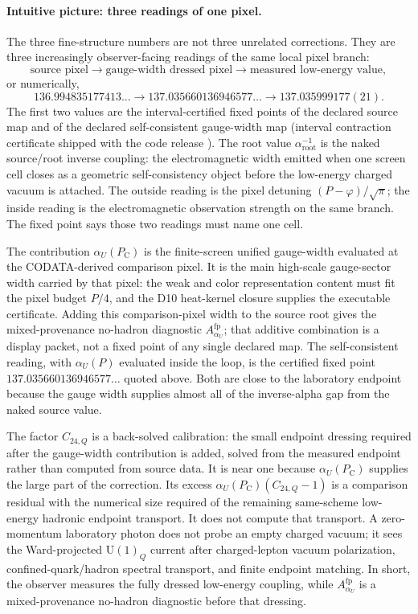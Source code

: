 \documentclass[11pt]{article}
\theoremstyle{remark}
\newcommand{\Ppub}{P_{\mathrm C}}
\begin{document}
\paragraph*{Intuitive picture: three readings of one pixel.}
The three fine-structure numbers are not three unrelated corrections. They are
three increasingly observer-facing readings of the same local pixel branch:
\[
\text{source pixel}
\longrightarrow
\text{gauge-width dressed pixel}
\longrightarrow
\text{measured low-energy value},
\]
or numerically,
\[
136.994835177413\ldots
\longrightarrow
137.035660136946577\ldots
\longrightarrow
137.035999177(21).
\]
The first two values are the interval-certified fixed points of the declared
source map and of the declared self-consistent gauge-width map
(interval contraction certificate shipped with the code release \cite{oph-code}).
The root value \(\alpha_{\mathrm{root}}^{-1}\) is the naked source/root inverse
coupling: the electromagnetic width emitted when one screen cell closes as a
geometric self-consistency object before the low-energy charged vacuum is
attached. The outside reading is the pixel detuning
\((P-\varphi)/\sqrt\pi\); the inside reading is the electromagnetic observation
strength on the same branch. The fixed point says those two readings must name
one cell.

The contribution \(\alpha_U(\Ppub)\) is the finite-screen unified gauge-width evaluated at the
CODATA-derived comparison pixel. It is the main high-scale gauge-sector width carried by that
pixel: the weak and color representation content must fit the pixel budget
\(P/4\), and the D10 heat-kernel closure supplies the executable certificate.
Adding this comparison-pixel width to the source root gives the mixed-provenance no-hadron
diagnostic \(A_{\alpha_U}^{\mathrm{fp}}\); that additive combination is a display packet,
not a fixed point of any single declared map. The self-consistent reading, with
\(\alpha_U(P)\) evaluated inside the loop, is the certified fixed point
\(137.035660136946577\ldots\) quoted above. Both are close to the laboratory endpoint because
the gauge width supplies almost all of the inverse-alpha gap from the naked source value.

The factor \(C_{24,Q}\) is a back-solved calibration: the small endpoint
dressing required after the gauge-width contribution is added, solved from the
measured endpoint rather than computed from source data. It is near one
because \(\alpha_U(\Ppub)\)
supplies the large part of the correction. Its excess
\(\alpha_U(\Ppub)(C_{24,Q}-1)\) is a comparison residual with the numerical size required of the
remaining same-scheme low-energy hadronic endpoint transport. It does not compute that transport. A zero-momentum laboratory photon does
not probe an empty charged vacuum; it sees the Ward-projected \(\mathrm U(1)_Q\)
current after charged-lepton vacuum polarization, confined-quark/hadron
spectral transport, and finite endpoint matching. In short, the observer
measures the fully dressed low-energy coupling, while
\(A_{\alpha_U}^{\mathrm{fp}}\) is a mixed-provenance no-hadron diagnostic before that dressing.
\end{document}
